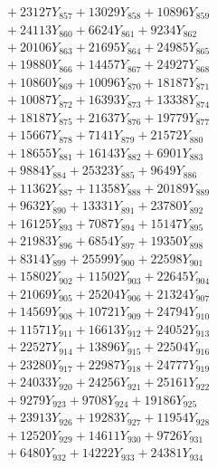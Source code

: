 \documentclass[a4paper,10pt]{article}
\begin{document}
{\begin{align}
&\;  + 23127 Y_{857} + 13029 Y_{858} + 10896 Y_{859} \\[0.3ex]
&\;  + 24113 Y_{860} + 6624 Y_{861} + 9234 Y_{862} \\[0.3ex]
&\;  + 20106 Y_{863} + 21695 Y_{864} + 24985 Y_{865} \\[0.3ex]
&\;  + 19880 Y_{866} + 14457 Y_{867} + 24927 Y_{868} \\[0.5ex]\allowbreak
&\;  + 10860 Y_{869} + 10096 Y_{870} + 18187 Y_{871} \\[0.3ex]
&\;  + 10087 Y_{872} + 16393 Y_{873} + 13338 Y_{874} \\[0.3ex]
&\;  + 18187 Y_{875} + 21637 Y_{876} + 19779 Y_{877} \\[0.3ex]
&\;  + 15667 Y_{878} + 7141 Y_{879} + 21572 Y_{880} \\[0.3ex]
&\;  + 18655 Y_{881} + 16143 Y_{882} + 6901 Y_{883} \\[0.3ex]
&\;  + 9884 Y_{884} + 25323 Y_{885} + 9649 Y_{886} \\[0.3ex]
&\;  + 11362 Y_{887} + 11358 Y_{888} + 20189 Y_{889} \\[0.3ex]
&\;  + 9632 Y_{890} + 13331 Y_{891} + 23780 Y_{892} \\[0.3ex]
&\;  + 16125 Y_{893} + 7087 Y_{894} + 15147 Y_{895} \\[0.3ex]
&\;  + 21983 Y_{896} + 6854 Y_{897} + 19350 Y_{898} \\[0.5ex]\allowbreak
&\;  + 8314 Y_{899} + 25599 Y_{900} + 22598 Y_{901} \\[0.3ex]
&\;  + 15802 Y_{902} + 11502 Y_{903} + 22645 Y_{904} \\[0.3ex]
&\;  + 21069 Y_{905} + 25204 Y_{906} + 21324 Y_{907} \\[0.3ex]
&\;  + 14569 Y_{908} + 10721 Y_{909} + 24794 Y_{910} \\[0.3ex]
&\;  + 11571 Y_{911} + 16613 Y_{912} + 24052 Y_{913} \\[0.3ex]
&\;  + 22527 Y_{914} + 13896 Y_{915} + 22504 Y_{916} \\[0.3ex]
&\;  + 23280 Y_{917} + 22987 Y_{918} + 24777 Y_{919} \\[0.3ex]
&\;  + 24033 Y_{920} + 24256 Y_{921} + 25161 Y_{922} \\[0.3ex]
&\;  + 9279 Y_{923} + 9708 Y_{924} + 19186 Y_{925} \\[0.3ex]
&\;  + 23913 Y_{926} + 19283 Y_{927} + 11954 Y_{928} \\[0.5ex]\allowbreak
&\;  + 12520 Y_{929} + 14611 Y_{930} + 9726 Y_{931} \\[0.3ex]
&\;  + 6480 Y_{932} + 14222 Y_{933} + 24381 Y_{934} \\[0.3ex]

\end{align}}
\end{document}
